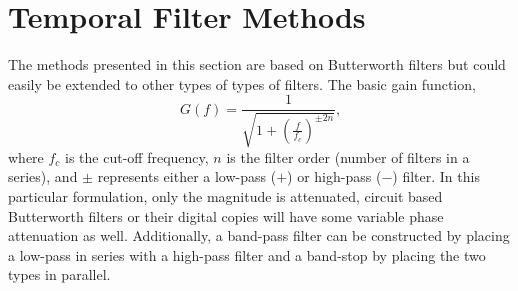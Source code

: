 \section{Temporal Filter Methods}
The methods presented in this section are based on Butterworth filters \cite{Butterworth-1930-DvDrjKha} but could easily be extended to other types of types of filters.
The basic gain function,
\begin{equation}
  G(f) = \frac{1}{\sqrt{1+\left(\frac{f}{f_c}\right)^{\pm2n}}} \textrm{,}
  \label{eqn:04_butterworth}
\end{equation}
where $f_c$ is the cut-off frequency, $n$ is the filter order (number of filters in a series), and $\pm$ represents either a low-pass ($+$) or high-pass ($-$) filter.
In this particular formulation, only the magnitude is attenuated, circuit based Butterworth filters or their digital copies will have some variable phase attenuation as well.
Additionally, a band-pass filter can be constructed by placing a low-pass in series with a high-pass filter and a band-stop by placing the two types in parallel.

